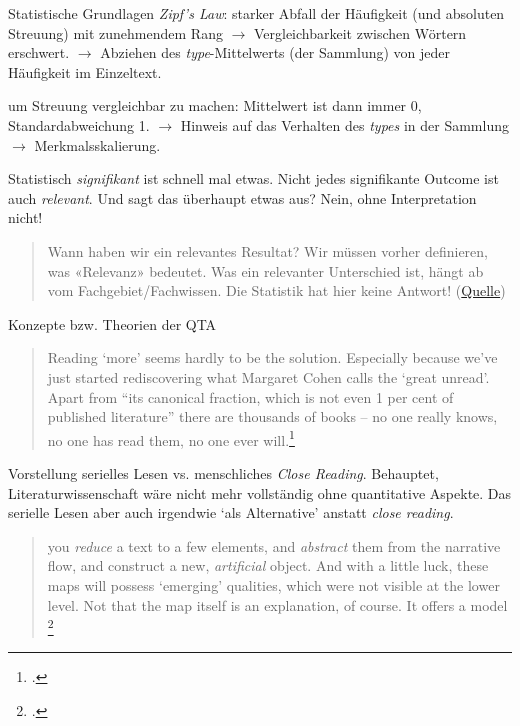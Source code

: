 \documentclass[10pt,a4paper]{article}
\begin{document}
\begin{multicols}{3}
\begin{textbox}{Statistische Grundlagen}
\emph{Zipf's Law}: starker Abfall der Häufigkeit (und absoluten Streuung) mit zunehmendem Rang $\to$ Vergleichbarkeit zwischen Wörtern erschwert. $\to$ Abziehen des \emph{type}-Mittelwerts (der Sammlung) von jeder Häufigkeit im Einzeltext.

 um Streuung vergleichbar zu machen: Mittelwert ist dann immer 0, Standardabweichung 1. $\to$ Hinweis auf das Verhalten des \emph{types} in der Sammlung $\to$ Merkmalsskalierung.


Statistisch \emph{signifikant} ist schnell mal etwas. Nicht jedes signifikante Outcome ist auch \emph{relevant}. Und sagt das überhaupt etwas aus? Nein, ohne Interpretation nicht! 
\begin{quote}
     Wann haben wir ein relevantes Resultat?
     Wir müssen vorher definieren, was «Relevanz» bedeutet.
     Was ein relevanter Unterschied ist, hängt ab vom Fachgebiet/Fachwissen.
     Die Statistik hat hier keine Antwort! (\href{https://metaphor.ethz.ch/x/2017/hs/401-0603-00L/zusatzmaterial/Wo11b_Relevanz.pdf}{Quelle})
\end{quote}

\end{textbox}

\begin{textbox}{Konzepte bzw. Theorien der QTA}
\begin{quote}
    Reading `more' seems hardly to be the solution. Especially because we've just started rediscovering what Margaret Cohen calls the `great unread'. \lbrack{} Apart from ``its canonical fraction, which is not even 1 per cent of published literature''\rbrack{} there are \lbrack{}thousands of books\rbrack{} -- no one really knows, no one has read them, no one ever will.\footcite[45]{distantreading} 
\end{quote}

Vorstellung serielles Lesen vs. menschliches \emph{Close Reading}. 
Behauptet, Literaturwissenschaft wäre nicht mehr vollständig ohne quantitative Aspekte. Das serielle Lesen aber auch irgendwie `als Alternative' anstatt \emph{close reading}.

\begin{quote}
    \punkti you \emph{reduce} a text to a few elements, and \emph{abstract} them from the narrative flow, and construct a new, \emph{artificial} object. \punkti And with a little luck, these maps will \punkti possess `emerging' qualities, which were not visible at the lower level. \punkti Not that the map itself is an explanation, of course. It offers a model \punkti\footcite[53]{graphsmoretti} 
\end{quote}



\end{textbox}
\end{multicols}
\end{document}
